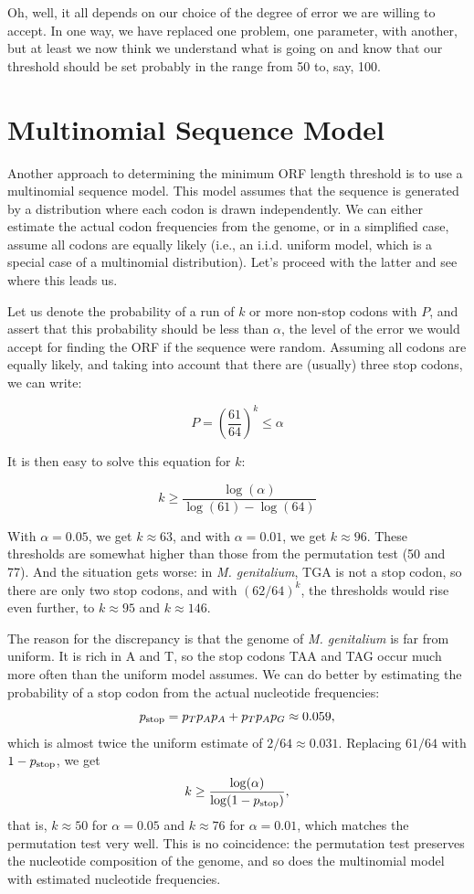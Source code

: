 Oh, well, it all depends on our choice of the degree of error we are willing to accept. In one way, we have replaced one problem, one parameter, with another, but at least we now think we understand what is going on and know that our threshold should be set probably in the range from 50 to, say, 100.

\section{Multinomial Sequence Model}

Another approach to determining the minimum ORF length threshold is to use a multinomial sequence model. This model assumes that the sequence is generated by a distribution where each codon is drawn independently. We can either estimate the actual codon frequencies from the genome, or in a simplified case, assume all codons are equally likely (i.e., an i.i.d. uniform model, which is a special case of a multinomial distribution). Let's proceed with the latter and see where this leads us.

Let us denote the probability of a run of $k$ or more non-stop codons with $P$, and assert that this probability should be less than $\alpha$, the level of the error we would accept for finding the ORF if the sequence were random. Assuming all codons are equally likely, and taking into account that there are (usually) three stop codons, we can write:

$$ P = \left(\frac{61}{64}\right)^k \leq \alpha  $$

It is then easy to solve this equation for $k$:

$$ k \geq \frac{\log(\alpha)}{\log(61) - \log(64)} $$

With $\alpha = 0.05$, we get $k\approx 63$, and with $\alpha = 0.01$, we get $k\approx 96$. These thresholds are somewhat higher than those from the permutation test (50 and 77). And the situation gets worse: in {\em M. genitalium}, TGA is not a stop codon, so there are only two stop codons, and with $(62/64)^k$, the thresholds would rise even further, to $k\approx 95$ and $k\approx 146$.

The reason for the discrepancy is that the genome of {\em M. genitalium} is far from uniform. It is rich in A and T, so the stop codons TAA and TAG occur much more often than the uniform model assumes. We can do better by estimating the probability of a stop codon from the actual nucleotide frequencies:
$$ p_{\rm stop} = p_T p_A p_A + p_T p_A p_G \approx 0.059, $$
which is almost twice the uniform estimate of $2/64 \approx 0.031$. Replacing $61/64$ with $1 - p_{\rm stop}$, we get
$$ k \geq \frac{\log(\alpha)}{\log(1 - p_{\rm stop})}, $$
that is, $k\approx 50$ for $\alpha = 0.05$ and $k\approx 76$ for $\alpha = 0.01$, which matches the permutation test very well. This is no coincidence: the permutation test preserves the nucleotide composition of the genome, and so does the multinomial model with estimated nucleotide frequencies.

